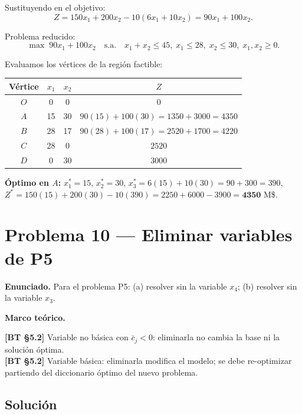 \documentclass{article}
\newenvironment{marco}{\begin{mdframed}[linecolor=black!40,backgroundcolor=gray!5]\small\textbf{Marco teórico.}\par\smallskip}{\end{mdframed}\medskip}
\begin{document}
Sustituyendo en el objetivo:
\[
  Z = 150x_1 + 200x_2 - 10(6x_1 + 10x_2) = 90x_1 + 100x_2.
\]

Problema reducido:
\[
\max\; 90x_1 + 100x_2 \quad \text{s.a.}\quad x_1+x_2\leq 45,\; x_1\leq 28,\; x_2\leq 30,\; x_1,x_2\geq 0.
\]

Evaluamos los vértices de la región factible:
\begin{center}
\begin{tabular}{cccc}
\hline
Vértice & $x_1$ & $x_2$ & $Z$\\
\hline
$O$ & 0 & 0 & 0 \\
$A$ & 15 & 30 & $90(15)+100(30)=1350+3000=4350$ \\
$B$ & 28 & 17 & $90(28)+100(17)=2520+1700=4220$ \\
$C$ & 28 & 0 & $2520$ \\
$D$ & 0 & 30 & $3000$ \\
\hline
\end{tabular}
\end{center}

\textbf{Óptimo en $A$:} $x_1^* = 15$, $x_2^* = 30$, $x_3^* = 6(15)+10(30) = 90+300 = 390$,
$Z^* = 150(15)+200(30)-10(390) = 2250+6000-3900 = \mathbf{4350}$ M\$.

\section*{Problema 10 --- Eliminar variables de P5}

\textbf{Enunciado.} Para el problema P5: (a) resolver sin la variable $x_4$; (b) resolver sin la variable $x_3$.

\begin{marco}
\textbf{[BT §5.2]} Variable no básica con $\bar{c}_j < 0$: eliminarla no cambia la base ni la solución óptima. \\[2pt]
\textbf{[BT §5.2]} Variable básica: eliminarla modifica el modelo; se debe re-optimizar partiendo del diccionario óptimo del nuevo problema.
\end{marco}

\subsection*{Solución}
\end{document}
